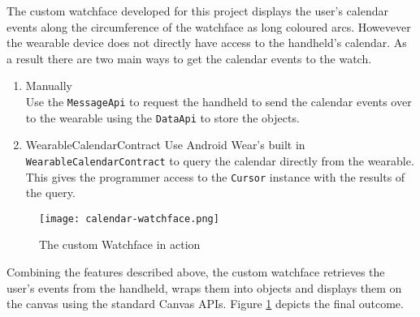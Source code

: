 The custom watchface developed for this project displays the user's calendar
events along the circumference of the watchface as long coloured arcs. Howevever
the wearable device does not directly have access to the handheld's calendar.
As a result there are two main ways to get the calendar events to the watch.
\begin{enumerate}
\item Manually\\
    Use the \texttt{MessageApi} to request the handheld to send the calendar
    events over to the wearable using the \texttt{DataApi} to store the objects.
\item WearableCalendarContract
    Use Android Wear's built in \texttt{WearableCalendarContract} to query the
    calendar directly from the wearable. This gives the programmer access to the
    \texttt{Cursor} instance with the results of the query.
\end{enumerate}

\begin{figure}
    \centering
    \texttt{[image: calendar-watchface.png]}
    \caption{The custom Watchface in action}
    \label{fig:calendar_watchface}
\end{figure}

Combining the features described above, the custom watchface retrieves the
user's events from the handheld, wraps them into objects and displays them on
the canvas using the standard Canvas APIs. Figure \ref{fig:calendar_watchface}
depicts the final outcome.
